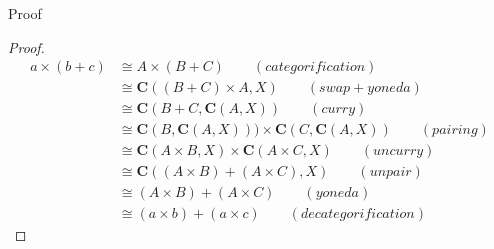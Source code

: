 \documentclass[tikz]{beamer}
\theoremstyle{definition}
\begin{document}
\begin{frame}{Proof}
 \begin{proof}{}
 \begin{align*}
     a \times (b + c) &\cong A \times (B + C) \qquad (categorification) \\
                      &\cong \mathbf{C}((B + C) \times A, X) \qquad (swap + yoneda) \\
                      &\cong \mathbf{C}(B + C, \mathbf{C}(A, X)) \qquad (curry)\\
                      &\cong \mathbf{C}(B, \mathbf{C}(A, X)))   \times \mathbf{C}(C, \mathbf{C}(A, X)) \qquad (pairing) \\
                      &\cong \mathbf{C}(A\times B, X) \times \mathbf{C}(A\times C, X) \qquad (uncurry) \\
                      &\cong \mathbf{C}((A \times B) + (A \times C), X) \qquad (unpair)\\
                      &\cong (A \times B) + (A \times C) \qquad (yoneda) \\
                      &\cong (a \times b) + (a \times c) \qquad (decategorification)
 \end{align*}{}
 \end{proof}
\end{frame}{}
\end{document}
